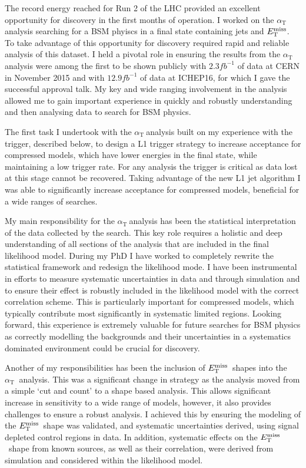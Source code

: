 \documentclass[11pt]{article}
\theoremstyle{plain} \numberwithin{equation}{section}
\theoremstyle{definition}
\DeclareRobustCommand{\alphat}{$\alpha_{\text{T}}~$}
\DeclareRobustCommand{\met}{$\mbox{$E_\text{T}^{\rm miss}$}\xspace$}
\newcounter{list}
\begin{document}
The record energy reached for Run 2 of the LHC provided an excellent opportunity for discovery
in the first months of operation. I worked on the \alphat analysis searching for a BSM phyiscs in a 
final state containing jets and \met. 
To take advantage of this opportunity for discovery required rapid and reliable analysis of this dataset. 
I held a pivotal role in ensuring the results from the \alphat analysis were among the 
first to be shown publicly with $2.3{fb}^{-1}$ of data at CERN in November 2015
and with $12.9{fb}^{-1}$ of data at ICHEP16, for which I gave the successful
approval talk. My key and wide ranging involvement in the analysis allowed me to gain important experience 
in quickly and robustly understanding and then analysing data to search for BSM physics. 

The first task I undertook with the \alphat analysis built on my experience with the 
trigger, described below, to design a L1 trigger strategy to increase acceptance for compressed models,
which have lower energies in the final state, while maintaining a low trigger rate. 
For any analysis the trigger is critical as data lost at this stage cannot be recovered. 
Taking advantage of the new L1 jet algorithm I was able to significantly increase 
acceptance for compressed models, beneficial for a wide ranges of searches.

My main responsibility for the \alphat analysis has been the statistical interpretation
of the data collected by the search. This key role requires a holistic and deep understanding
of all sections of the analysis that are included in the final likelihood model. During my
PhD I have worked to completely rewrite the statistical framework and redesign the likelihood mode. 
I have been instrumental in efforts to measure systematic uncertainties in data and through simulation and to
ensure their effect is robustly included in the likelihood 
model with the correct correlation scheme. This is particularly important for compressed models, which typically
contribute most significantly in systematic limited regions. Looking forward, this experience is extremely valuable 
for future searches for BSM physics as correctly modelling the backgrounds and their uncertainties in a systematics 
dominated environment could be crucial for discovery.

Another of my responsibilities has been the inclusion of \met~shapes into the \alphat
analysis. This was a significant change in strategy as the analysis moved from a simple `cut and
count' to a shape based analysis. This allows significant increase in sensitivity to a wide 
range of models, however, it also provides challenges to ensure a robust analysis. I achieved this
by ensuring the modeling of the \met~shape was validated, and systematic uncertainties derived, 
using signal depleted control regions in data. In addition, systematic effects on the \met~shape from known sources,
as well as their correlation, were derived from simulation and considered within the likelihood model.
\end{document}
